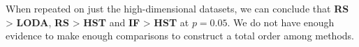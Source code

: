 When repeated on just the high-dimensional datasets, we can conclude that \textbf{RS} > \textbf{LODA}, \textbf{RS} > \textbf{HST} and \textbf{IF} > \textbf{HST} at $p=0.05$. We do not have enough evidence to make enough comparisons to construct a total order among methods.



